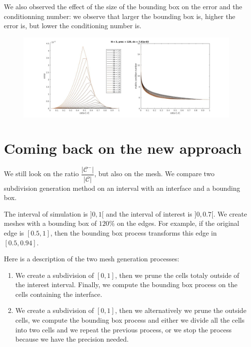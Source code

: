 \documentclass[a4paper,10pt]{article}
\begin{document}
We also observed the effect of the size of the bounding box on the error and 
the conditionning number: we observe that larger the bounding box is, higher 
the error is, but lower the conditioning number is.

\begin{figure}[hb!]
 \centering
 \includegraphics[width=\textwidth]{figure/bberror_N3_prec128.jpg}
\end{figure}

\clearpage

\section{Coming back on the new approach}

We still look on the ratio $\dfrac{|\mathcal{C}^-|}{|\mathcal{C}|}$, but also 
on the mesh. We compare two subdivision generation method on an interval with 
an interface and a bounding box.

The interval of simulation is $]0,1[$ and the interval of interest is 
$]0,0.7[$. We create meshes with a bounding box of $120 \%$ on the edges. For 
example, if the original edge is $[0.5,1]$, then the bounding box process 
transforms this edge in $[0.5,0.94]$.

Here is a description of the two mesh generation processes:
\begin{enumerate}[label=(\alph*)]
 \item\label{process_a} We create a subdivision of $[0,1]$, then we prune 
the cells totaly 
outside of the interest interval. Finally, we compute the bounding box process 
on the cells containing the interface.
 \item\label{process_b} We create a subdivision of $[0,1]$, then we 
alternatively we prune 
the outside cells, we compute the bounding box process and either we divide all 
the cells into two cells and we repeat the previous process, or we stop the 
process because we have the precision needed.
\end{enumerate}
\end{document}
